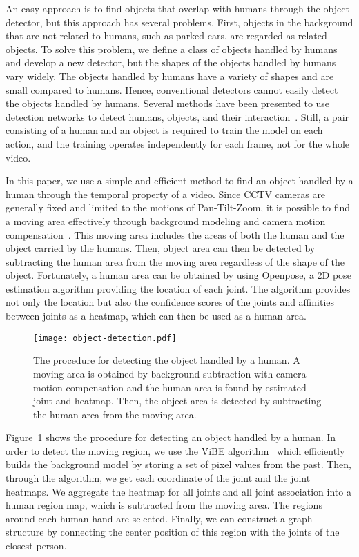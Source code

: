 \documentclass[10pt,twocolumn,letterpaper]{article}
\begin{document}
An easy approach is to find objects that overlap with humans through the object detector, but this approach has several problems.
First, objects in the background that are not related to humans, such as parked cars, are regarded as related objects.
To solve this problem, we define a class of objects handled by humans and develop a new detector, but the shapes of the objects handled by humans vary widely.
The objects handled by humans have a variety of shapes and are small compared to humans. 
Hence, conventional detectors cannot easily detect the objects handled by humans.
Several methods have been presented to use detection networks to detect humans, objects, and their interaction~\cite{Hu:2018vj,Gkioxari:2018uv}. 
Still, a pair consisting of a human and an object is required to train the model on each action, and the training operates independently for each frame, not for the whole video.

In this paper, we use a simple and efficient method to find an object handled by a human through the temporal property of a video.
Since CCTV cameras are generally fixed and limited to the motions of Pan-Tilt-Zoom, it is possible to find a moving area effectively through background modeling and camera motion compensation~\cite{Kim:2012bo,Yi:2013gp,Yun:2017jd}.
This moving area includes the areas of both the human and the object carried by the humans. 
Then, object area can then be detected by subtracting the human area from the moving area regardless of the shape of the object. Fortunately, a human area can be obtained by using Openpose, a 2D pose estimation algorithm providing the location of each joint. The algorithm provides not only the location but also the confidence scores of the joints and affinities between joints as a heatmap, which can then be used as a human area.

\begin{figure}[t]
\begin{center}
   \texttt{[image: object-detection.pdf]}
\end{center}
   \caption{The procedure for detecting the object handled by a human. A moving area is obtained by background subtraction with camera motion compensation and the human area is found by estimated joint and heatmap. Then, the object area is detected by subtracting the human area from the moving area.
   }
\label{fig:object-det}
\end{figure}

Figure~\ref{fig:object-det} shows the procedure for detecting an object handled by a human.
In order to detect the moving region, we use the ViBE algorithm~\cite{Barnich:2011ks} which efficiently builds the background model by storing a set of pixel values from the past.
Then, through the  algorithm, we get each coordinate of the joint and the joint heatmaps.
We aggregate the heatmap for all joints and all joint association into a human region map, which is subtracted from the moving area.
The regions around each human hand are selected.
Finally, we can construct a graph structure by connecting the center position of this region with the joints of the closest person.
\end{document}
